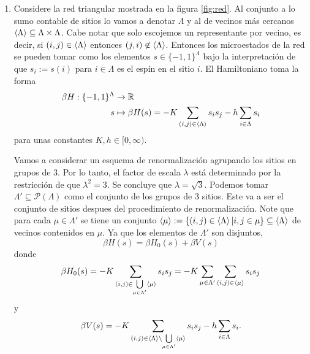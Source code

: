 \documentclass{article}
\begin{document}
\begin{enumerate}

\item Considere la red triangular mostrada en la figura \ref{fig:red}. Al conjunto  a lo sumo contable de sitios lo vamos a denotar $\Lambda$ y al de vecinos más cercanos $\ev{\Lambda}\subseteq\Lambda\times\Lambda$. Cabe notar que solo escojemos un representante por vecino, es decir, si $(i,j)\in\ev{\Lambda}$ entonces $(j,i)\not\in\ev{\Lambda}$. Entonces los microestados de la red se pueden tomar como los elementos $s\in\{-1,1\}^\Lambda$ bajo la interpretación de que $s_i:=s(i)$ para $i\in\Lambda$ es el espín en el sitio $i$. El Hamiltoniano toma la forma
\begin{align}
\begin{split}
\beta H:\{-1,1\}^\Lambda&\rightarrow \mathbb{R}\\
s&\mapsto \beta H(s)=-K\sum_{(i,j)\in\ev{\Lambda}}s_is_j-h\sum_{i\in\Lambda}s_i
\end{split}
\end{align} 
para unas constantes $K,h\in[0,\infty)$.

Vamos a considerar un esquema de renormalización agrupando los sitios en grupos de 3. Por lo tanto, el factor de escala $\lambda$ está determinado por la restricción de que $\lambda^2=3$. Se concluye que $\lambda=\sqrt{3}$. Podemos tomar $\Lambda'\subseteq \mathcal{P}(\Lambda)$ como el conjunto de los grupos de 3 sitios. Este va a ser el conjunto de sitios despues del procedimiento de renormalización. Note que para cada $\mu\in\Lambda'$ se tiene un conjunto $\ev{\mu}:=\{(i,j)\in\ev{\Lambda}|i,j\in\mu\}\subseteq\ev{\Lambda}$ de vecinos contenidos en $\mu$. Ya que los elementos de $\Lambda'$ son disjuntos,
\begin{equation}
\beta H(s)=\beta H_0(s)+\beta V(s)
\end{equation}
donde
\begin{equation}
\beta H_0(s)=-K\sum_{(i,j)\in\bigcup\limits_{\mu\in\Lambda'}\ev{\mu}}s_is_j=-K\sum_{\mu\in\Lambda'}\sum_{(i,j)\in\ev{\mu}}s_is_j
\end{equation}
y
\begin{equation}
\beta V(s)=-K\sum_{(i,j)\in\ev{\Lambda}\setminus\bigcup\limits_{\mu\in\Lambda'}\ev{\mu}}s_is_j-h\sum_{i\in\Lambda}s_i.
\end{equation}


\end{enumerate}
\end{document}

